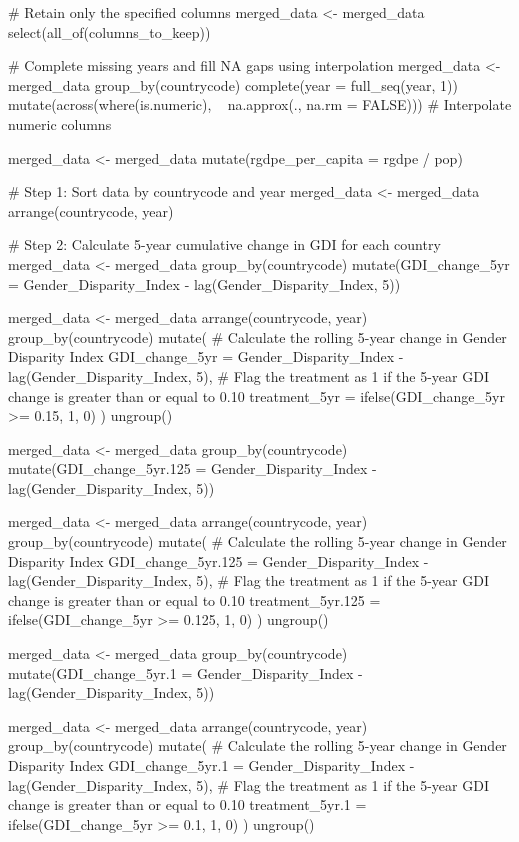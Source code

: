 {{# Retain only the specified columns
merged_data <- merged_data %
  select(all_of(columns_to_keep))

# Complete missing years and fill NA gaps using interpolation
merged_data <- merged_data %
  group_by(countrycode) %
  complete(year = full_seq(year, 1)) %
  mutate(across(where(is.numeric), ~ na.approx(., na.rm = FALSE)))  # Interpolate numeric columns

merged_data <- merged_data %
  mutate(rgdpe_per_capita = rgdpe / pop)


# Step 1: Sort data by countrycode and year
merged_data <- merged_data %
  arrange(countrycode, year)

# Step 2: Calculate 5-year cumulative change in GDI for each country
merged_data <- merged_data %
  group_by(countrycode) %
  mutate(GDI_change_5yr = Gender_Disparity_Index - lag(Gender_Disparity_Index, 5))

merged_data <- merged_data %
  arrange(countrycode, year) %
  group_by(countrycode) %
  mutate(
    # Calculate the rolling 5-year change in Gender Disparity Index
    GDI_change_5yr = Gender_Disparity_Index - lag(Gender_Disparity_Index, 5),
    # Flag the treatment as 1 if the 5-year GDI change is greater than or equal to 0.10
    treatment_5yr = ifelse(GDI_change_5yr >= 0.15, 1, 0)  ) %
  ungroup()

merged_data <- merged_data %
  group_by(countrycode) %
  mutate(GDI_change_5yr.125 = Gender_Disparity_Index - lag(Gender_Disparity_Index, 5))

merged_data <- merged_data %
  arrange(countrycode, year) %
  group_by(countrycode) %
  mutate(
    # Calculate the rolling 5-year change in Gender Disparity Index
    GDI_change_5yr.125 = Gender_Disparity_Index - lag(Gender_Disparity_Index, 5),
    # Flag the treatment as 1 if the 5-year GDI change is greater than or equal to 0.10
    treatment_5yr.125 = ifelse(GDI_change_5yr >= 0.125, 1, 0)  ) %
  ungroup()


merged_data <- merged_data %
  group_by(countrycode) %
  mutate(GDI_change_5yr.1 = Gender_Disparity_Index - lag(Gender_Disparity_Index, 5))

merged_data <- merged_data %
  arrange(countrycode, year) %
  group_by(countrycode) %
  mutate(
    # Calculate the rolling 5-year change in Gender Disparity Index
    GDI_change_5yr.1 = Gender_Disparity_Index - lag(Gender_Disparity_Index, 5),
    # Flag the treatment as 1 if the 5-year GDI change is greater than or equal to 0.10
    treatment_5yr.1 = ifelse(GDI_change_5yr >= 0.1, 1, 0)  ) %
  ungroup()

}}
